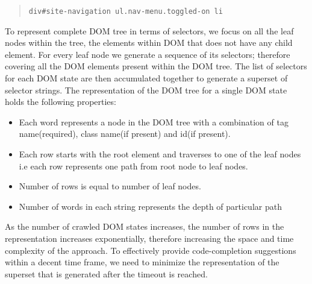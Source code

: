 		\begin{quote}
			\texttt{div\#site-navigation ul.nav-menu.toggled-on li}
		\end{quote}
			
		To represent complete DOM tree in terms of \css selectors, we focus on all the leaf nodes within the tree, \ie the elements within DOM that does not have any child element. For every leaf node we generate a sequence of its \css selectors; therefore covering all the DOM elements present within the DOM tree. The list of \css selectors for each DOM state are then accumulated together to generate a superset of \css selector strings. The \css representation of the DOM tree for a single DOM state holds the following properties:
		\begin{itemize}
			 \item Each word represents a node in the DOM tree with a combination of tag name(required), class name(if present) and id(if present).
			 \item Each row starts with the root element and traverses to one of the leaf nodes i.e each row represents one path from root node to leaf nodes.
			\item Number of rows is equal to number of leaf nodes.
			 \item Number of words in each string represents the depth of particular path
		\end{itemize}
		
		As the number of crawled DOM states increases, the number of rows in the \css representation increases exponentially, therefore increasing the space and time complexity of the approach. To effectively provide code-completion suggestions within a decent time frame, we need to minimize the \css representation of the superset that is generated after the timeout is reached.
		
